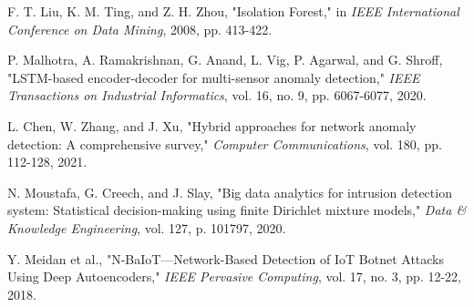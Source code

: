 \documentclass[conference]{IEEEtran}
\begin{document}
\begin{thebibliography}{00}
 F. T. Liu, K. M. Ting, and Z. H. Zhou, "Isolation Forest," in \textit{IEEE International Conference on Data Mining}, 2008, pp. 413-422.

 P. Malhotra, A. Ramakrishnan, G. Anand, L. Vig, P. Agarwal, and G. Shroff, "LSTM-based encoder-decoder for multi-sensor anomaly detection," \textit{IEEE Transactions on Industrial Informatics}, vol. 16, no. 9, pp. 6067-6077, 2020.

 L. Chen, W. Zhang, and J. Xu, "Hybrid approaches for network anomaly detection: A comprehensive survey," \textit{Computer Communications}, vol. 180, pp. 112-128, 2021.

 N. Moustafa, G. Creech, and J. Slay, "Big data analytics for intrusion detection system: Statistical decision-making using finite Dirichlet mixture models," \textit{Data \& Knowledge Engineering}, vol. 127, p. 101797, 2020.

 Y. Meidan et al., "N-BaIoT—Network-Based Detection of IoT Botnet Attacks Using Deep Autoencoders," \textit{IEEE Pervasive Computing}, vol. 17, no. 3, pp. 12-22, 2018.

\end{thebibliography}
\end{document}
